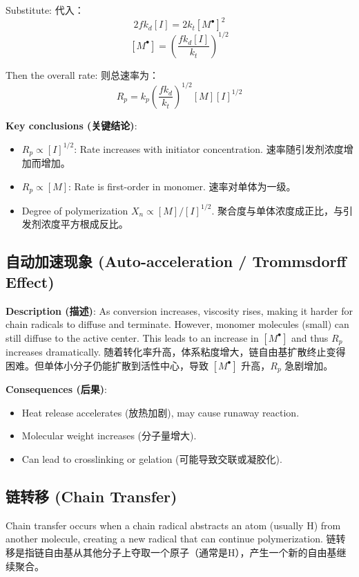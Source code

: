 \documentclass[12pt,a4paper]{ctexart}
\begin{document}
Substitute:  
代入：
\[
2 f k_d [I] = 2 k_t [M^\bullet]^2
\]
\[
[M^\bullet] = \left( \frac{f k_d [I]}{k_t} \right)^{1/2}
\]

Then the overall rate:  
则总速率为：
\[
R_p = k_p \left( \frac{f k_d}{k_t} \right)^{1/2} [M] [I]^{1/2}
\]

\textbf{Key conclusions (关键结论)}:
\begin{itemize}
    \item $R_p \propto [I]^{1/2}$: Rate increases with initiator concentration. 速率随引发剂浓度增加而增加。
    \item $R_p \propto [M]$: Rate is first-order in monomer. 速率对单体为一级。
    \item Degree of polymerization $X_n \propto [M]/[I]^{1/2}$. 聚合度与单体浓度成正比，与引发剂浓度平方根成反比。
\end{itemize}

\subsection{自动加速现象 (Auto-acceleration / Trommsdorff Effect)}

\textbf{Description (描述)}: As conversion increases, viscosity rises, making it harder for chain radicals to diffuse and terminate. However, monomer molecules (small) can still diffuse to the active center. This leads to an increase in $[M^\bullet]$ and thus $R_p$ increases dramatically.  
随着转化率升高，体系粘度增大，链自由基扩散终止变得困难。但单体小分子仍能扩散到活性中心，导致 $[M^\bullet]$ 升高，$R_p$ 急剧增加。

\textbf{Consequences (后果)}:
\begin{itemize}
    \item Heat release accelerates (放热加剧), may cause runaway reaction.
    \item Molecular weight increases (分子量增大).
    \item Can lead to crosslinking or gelation (可能导致交联或凝胶化).
\end{itemize}

\subsection{链转移 (Chain Transfer)}

Chain transfer occurs when a chain radical abstracts an atom (usually H) from another molecule, creating a new radical that can continue polymerization.  
链转移是指链自由基从其他分子上夺取一个原子（通常是H），产生一个新的自由基继续聚合。
\end{document}
